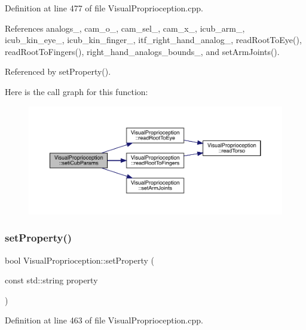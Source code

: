 Definition at line 477 of file Visual\+Proprioception.\+cpp.



References analogs\+\_\+, cam\+\_\+o\+\_\+, cam\+\_\+sel\+\_\+, cam\+\_\+x\+\_\+, icub\+\_\+arm\+\_\+, icub\+\_\+kin\+\_\+eye\+\_\+, icub\+\_\+kin\+\_\+finger\+\_\+, itf\+\_\+right\+\_\+hand\+\_\+analog\+\_\+, read\+Root\+To\+Eye(), read\+Root\+To\+Fingers(), right\+\_\+hand\+\_\+analogs\+\_\+bounds\+\_\+, and set\+Arm\+Joints().



Referenced by set\+Property().

Here is the call graph for this function\+:
\nopagebreak
\begin{figure}[H]
\begin{center}
\leavevmode
\includegraphics[width=350pt]{classVisualProprioception_a23b9c75f9a3c44442a371676a0379a19_cgraph}
\end{center}
\end{figure}
\mbox{\label{classVisualProprioception_a59835a3e089f463855de8e228fc4fd91}} 
\subsubsection{\texorpdfstring{set\+Property()}{setProperty()}}
{\footnotesize\ttfamily bool Visual\+Proprioception\+::set\+Property (\begin{DoxyParamCaption}\item[{const std\+::string}]{property }\end{DoxyParamCaption})\hspace{0.3cm}{\ttfamily [override]}}



Definition at line 463 of file Visual\+Proprioception.\+cpp.



